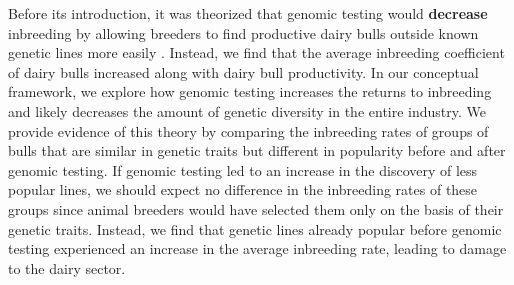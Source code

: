\documentclass[12pt,letterpaper]{article}
\begin{document}

Before its introduction, it was theorized that genomic testing would \textbf{decrease} inbreeding by allowing breeders to find productive dairy bulls outside known genetic lines more easily \citep{Daetwyler2007}. 
Instead, we find that the average inbreeding coefficient of dairy bulls increased along with dairy bull productivity.
In our conceptual framework, we explore how genomic testing increases the returns to inbreeding and likely decreases the amount of genetic diversity in the entire industry.
We provide evidence of this theory by comparing the inbreeding rates of groups of bulls that are similar in genetic traits but different in popularity before and after genomic testing.
If genomic testing led to an increase in the discovery of less popular lines, we should expect no difference in the inbreeding rates of these groups since animal breeders would have selected them only on the basis of their genetic traits.
Instead, we find that genetic lines already popular before genomic testing experienced an increase in the average inbreeding rate, leading to damage to the dairy sector.




\end{document}

